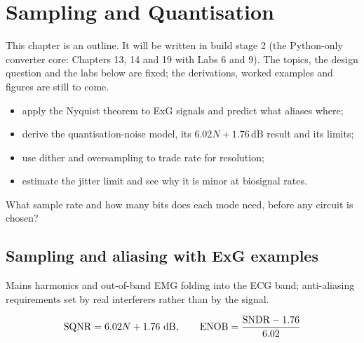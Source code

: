 \chapter{Sampling and Quantisation}\label{ch:sampling}

\begin{specnote}
This chapter is an outline. It will be written in build stage 2 (the Python-only converter core: Chapters 13, 14 and 19 with Labs 6 and 9). The topics, the design question and the labs below are fixed; the derivations, worked examples and figures are still to come.
\end{specnote}

\begin{objectives}
\begin{itemize}
  \item apply the Nyquist theorem to ExG signals and predict what aliases where;
  \item derive the quantisation-noise model, its $6.02N + 1.76$\,dB result and its limits;
  \item use dither and oversampling to trade rate for resolution;
  \item estimate the jitter limit and see why it is minor at biosignal rates.
\end{itemize}
\end{objectives}

\begin{insight}
What sample rate and how many bits does each \OB{} mode need, before any circuit is chosen?
\end{insight}

\section{Sampling and aliasing with ExG examples}\label{sec:ch13-1}
Mains harmonics and out-of-band EMG folding into the ECG band; anti-aliasing requirements set by real interferers rather than by the signal.

\begin{keyeq}
\begin{equation}
  \mathrm{SQNR} = 6.02N + 1.76\ \mathrm{dB}, \qquad \ENOB = \frac{\mathrm{SNDR} - 1.76}{6.02}
  \label{eq:sqnr}
\end{equation}
\end{keyeq}

